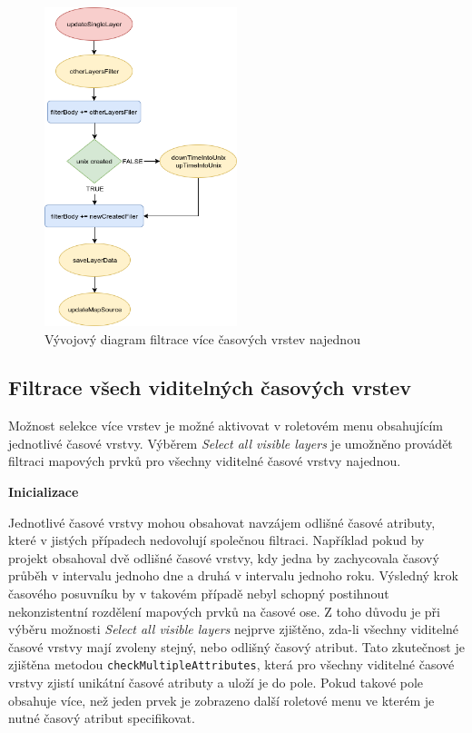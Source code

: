 \begin{figure}[h!]
\centering
\includegraphics[width=0.5\textwidth]{../img/getSingleLayer.png}
\caption{Vývojový diagram filtrace více časových vrstev najednou}
\label{fig:single-chart}
\end{figure}

\subsection{Filtrace všech viditelných časových vrstev}
\label{sssec:multiple-layers-filtration}

Možnost selekce více vrstev je možné aktivovat v roletovém menu
obsahujícím jednotlivé časové vrstvy. Výběrem \textit{Select all
visible layers} je umožněno provádět filtraci mapových prvků pro
všechny viditelné časové vrstvy najednou.

\bigskip
\noindent \textbf{Inicializace}

Jednotlivé časové vrstvy mohou obsahovat navzájem odlišné
časové atributy, které v jistých případech nedovolují společnou
filtraci. Například pokud by projekt obsahoval dvě odlišné časové
vrstvy, kdy jedna by zachycovala časový průběh v intervalu jednoho dne
a druhá v intervalu jednoho roku. Výsledný krok časového posuvníku by
v takovém případě nebyl schopný postihnout nekonzistentní rozdělení
mapových prvků na časové ose. Z toho důvodu je při výběru možnosti
\textit{Select all visible layers} nejprve zjištěno, zda-li všechny
viditelné časové vrstvy mají zvoleny stejný, nebo odlišný časový
atribut. Tato zkutečnost je zjištěna metodou \verb|checkMultipleAttributes|,
která pro všechny viditelné časové vrstvy zjistí unikátní časové
atributy a uloží je do pole. Pokud takové pole obsahuje více, než jeden
prvek je zobrazeno další roletové menu ve kterém je nutné časový
atribut specifikovat.

